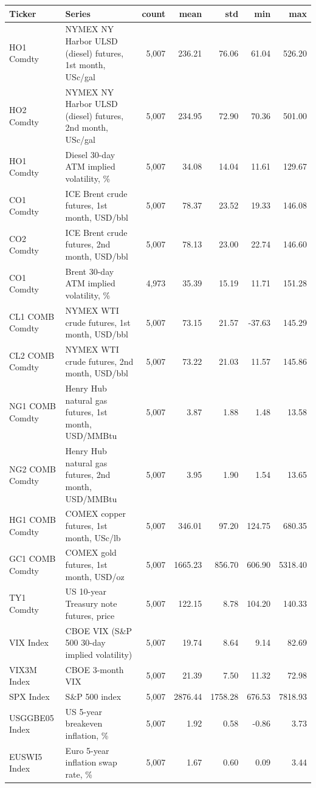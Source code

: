 \begin{tabular}{llrrrrr}
\toprule
Ticker & Series & count & mean & std & min & max \\
\midrule
HO1 Comdty & NYMEX NY Harbor ULSD (diesel) futures, 1st month, USc/gal & 5,007 & 236.21 & 76.06 & 61.04 & 526.20 \\
HO2 Comdty & NYMEX NY Harbor ULSD (diesel) futures, 2nd month, USc/gal & 5,007 & 234.95 & 72.90 & 70.36 & 501.00 \\
HO1 Comdty & Diesel 30-day ATM implied volatility, \% & 5,007 & 34.08 & 14.04 & 11.61 & 129.67 \\
CO1 Comdty & ICE Brent crude futures, 1st month, USD/bbl & 5,007 & 78.37 & 23.52 & 19.33 & 146.08 \\
CO2 Comdty & ICE Brent crude futures, 2nd month, USD/bbl & 5,007 & 78.13 & 23.00 & 22.74 & 146.60 \\
CO1 Comdty & Brent 30-day ATM implied volatility, \% & 4,973 & 35.39 & 15.19 & 11.71 & 151.28 \\
CL1 COMB Comdty & NYMEX WTI crude futures, 1st month, USD/bbl & 5,007 & 73.15 & 21.57 & -37.63 & 145.29 \\
CL2 COMB Comdty & NYMEX WTI crude futures, 2nd month, USD/bbl & 5,007 & 73.22 & 21.03 & 11.57 & 145.86 \\
NG1 COMB Comdty & Henry Hub natural gas futures, 1st month, USD/MMBtu & 5,007 & 3.87 & 1.88 & 1.48 & 13.58 \\
NG2 COMB Comdty & Henry Hub natural gas futures, 2nd month, USD/MMBtu & 5,007 & 3.95 & 1.90 & 1.54 & 13.65 \\
HG1 COMB Comdty & COMEX copper futures, 1st month, USc/lb & 5,007 & 346.01 & 97.20 & 124.75 & 680.35 \\
GC1 COMB Comdty & COMEX gold futures, 1st month, USD/oz & 5,007 & 1665.23 & 856.70 & 606.90 & 5318.40 \\
TY1 Comdty & US 10-year Treasury note futures, price & 5,007 & 122.15 & 8.78 & 104.20 & 140.33 \\
VIX Index & CBOE VIX (S\&P 500 30-day implied volatility) & 5,007 & 19.74 & 8.64 & 9.14 & 82.69 \\
VIX3M Index & CBOE 3-month VIX & 5,007 & 21.39 & 7.50 & 11.32 & 72.98 \\
SPX Index & S\&P 500 index & 5,007 & 2876.44 & 1758.28 & 676.53 & 7818.93 \\
USGGBE05 Index & US 5-year breakeven inflation, \% & 5,007 & 1.92 & 0.58 & -0.86 & 3.73 \\
EUSWI5 Index & Euro 5-year inflation swap rate, \% & 5,007 & 1.67 & 0.60 & 0.09 & 3.44 \\

\end{tabular}
